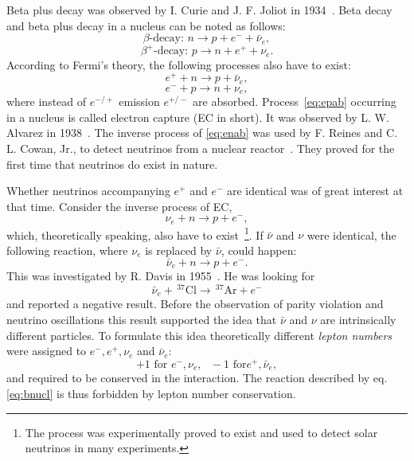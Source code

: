 Beta plus decay was observed by I. Curie and J. F. Joliot in 1934~\cite{Cur34}. Beta decay and beta plus decay in a nucleus can be noted as follows:
\begin{equation}
  \label{eq:bd}
  \beta\mbox{-decay: } n \rightarrow p+e^{-}+\bar{\nu}_e ,
\end{equation}
\begin{equation}
  \label{eq:bpd}
  \beta^+\mbox{-decay: } p \rightarrow n+e^{+}+\nu_e .
\end{equation}
According to Fermi's theory, the following processes also have to exist:
\begin{equation}
  \label{eq:enab}
  e^{+} + n \rightarrow p + \bar{\nu}_e ,
\end{equation}
\begin{equation}
  \label{eq:epab}
  e^{-} + p \rightarrow n + \nu_e ,
\end{equation}
where instead of $e^{-/+}$ emission $e^{+/-}$ are absorbed. Process~\ref{eq:epab} occurring in a nucleus is called electron capture (EC in short). It was observed by L. W. Alvarez in 1938~\cite{Alv38}. The inverse process of \ref{eq:enab} was used by F. Reines and C. L. Cowan, Jr., to detect neutrinos from a nuclear reactor~\cite{Cow56, Rei56}. They proved for the first time that neutrinos do exist in nature.

Whether neutrinos accompanying $e^{+}$ and $e^{-}$ are identical was of great interest at that time. Consider the inverse process of EC,
\begin{equation}
  \label{eq:nunab}
  \nu_e + n \rightarrow p + e^{-} ,
\end{equation}
which, theoretically speaking, also have to exist~\footnote{The process was experimentally proved to exist and used to detect solar neutrinos in many experiments.}. If $\bar{\nu}$ and $\nu$ were identical, the following reaction, where $\nu_e$ is replaced by $\bar{\nu}$, could happen:
\begin{equation}
  \label{eq:bnun}
  \bar{\nu}_e + n \rightarrow p + e^{-}.
\end{equation}
This was investigated by R. Davis in 1955~\cite{Dav55,Dav56}. He was looking for
\begin{equation}
  \label{eq:bnucl}
  \bar{\nu}_e + \, ^{37} \! \text{Cl} \rightarrow \, ^{37} \! \text{Ar} + e^{-}
\end{equation}
and reported a negative result. Before the observation of parity violation and neutrino oscillations this result supported the idea that $\bar{\nu}$ and $\nu$ are intrinsically different particles. To formulate this idea theoretically different \emph{lepton numbers} were assigned to $e^{-}, e^{+}, \nu_e$ and $\bar{\nu}_e$:
\begin{equation}
  \label{eq:ln}
  +1 \mbox{ for }e^{-}, \nu_e, \mbox{   }-1 \mbox{ for
}e^{+},\bar{\nu}_e,
\end{equation}
and required to be conserved in the interaction. The reaction described by eq. \ref{eq:bnucl} is thus forbidden by lepton number conservation.

